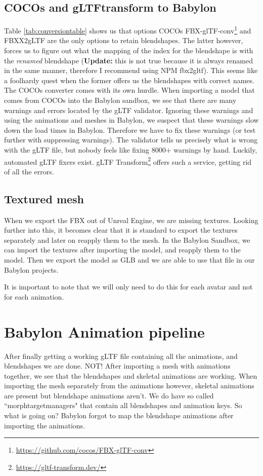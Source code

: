 \documentclass{uva-inf-article}
\begin{document}
\subsection{COCOs and gLTFtransform to Babylon}
Table \ref{tab:conversiontable} shows us that options COCOs FBX-glTF-conv\footnote{\url{https://github.com/cocos/FBX-glTF-conv}} and FBXX2gLTF are the only options to retain blendshapes. The latter however, forces us to figure out what the mapping of the index for the blendshape is with the \textit{renamed} blendshape (\textbf{Update:} this is not true because it is always renamed in the same manner, therefore I recommend using NPM fbx2gltf).  This seems like a foolhardy quest when the former offers us the blendshapes with correct names. The COCOs converter comes with its own hurdle. When importing a model that comes from COCOs into the Babylon sandbox, we see that there are many warnings and errors located by the gLTF validator. Ignoring these warnings and using the animations and meshes in Babylon, we suspect that these warnings slow down the load times in Babylon. Therefore we have to fix these warnings (or test further with suppressing warnings). The validator tells us precisely what is wrong with the gLTF file, but nobody feels like fixing 8000+ warnings by hand. Luckily, automated gLTF fixers exist. gLTF Transform\footnote{\url{https://gltf-transform.dev/}} offers such a service, getting rid of all the errors.

\subsection{Textured mesh}
When we export the FBX out of Unreal Engine, we are missing textures. Looking further into this, it becomes clear that it is standard to export the textures separately and later on reapply them to the mesh. In the Babylon Sandbox, we can import the textures after importing the model, and reapply them to the model. Then we export the model as GLB and we are able to use that file in our Babylon projects.

It is important to note that we will only need to do this for each avatar and not for each animation.

\section{Babylon Animation pipeline}
After finally getting a working gLTF file containing all the animations, and blendshapes we are done. NOT! After importing a mesh with animations together, we see that the blendshapes and skeletal animations are working. When importing the mesh separately from the animations however, skeletal animations are present but blendshape animations aren't. We do have so called ``morphtargetmanagers" that contain all blendshapes and animation keys. So what is going on? Babylon forgot to map the blendshape animations after importing the animations.
\end{document}
